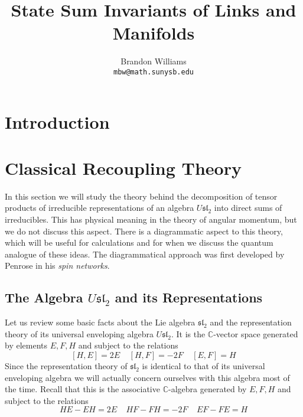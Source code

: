 









\title{\Large State Sum Invariants of Links and Manifolds}
\author{Brandon Williams \\ \texttt{mbw@math.sunysb.edu}}
\maketitle


\tableofcontents




\newpage
\section{Introduction}
\label{sec Introduction}




\newpage
\section{Classical Recoupling Theory}
\label{sec Classical Recoupling Theory}


In this section we will study the theory behind the decomposition of tensor products of irreducible representations of an algebra $U\mathfrak{sl}_2$ into direct sums of irreducibles. This has physical meaning in the theory of angular momentum, but we do not discuss this aspect. There is a diagrammatic aspect to this theory, which will be useful for calculations and for when we discuss the quantum analogue of these ideas. The diagrammatical approach was first developed by Penrose in his \emph{spin networks}. 


\subsection{The Algebra $U\mathfrak{sl}_2$ and its Representations}
\label{subsec The Lie Algebra sl2 and its Representations}

Let us review some basic facts about the Lie algebra $\mathfrak{sl}_2$ and the representation theory of its universal enveloping algebra $U\mathfrak{sl}_2$. It is the $\mathbb C$-vector space generated by elements $E,F,H$ and subject to the relations
\[ [H,E] = 2E \ \ \ \ \ [H,F]=-2F \ \ \ \ \ [E,F] = H \]
Since the representation theory of $\mathfrak{sl}_2$ is identical to that of its universal enveloping algebra we will actually concern ourselves with this algebra most of the time. Recall that this is the associative $\mathbb C$-algebra generated by $E,F,H$ and subject to the relations
\[ HE - EH = 2E \ \ \ \ \ HF - FH = -2F \ \ \ \ \ EF - FE = H \]

